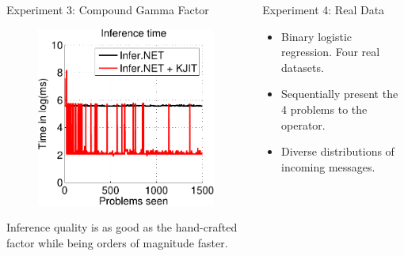 \documentclass[english]{beamer}
\begin{document}
\begin{frame}
\begin{columns}[t]
\begin{block}{ Experiment 3: Compound Gamma Factor }
\begin{figure}[ht]
{  \includegraphics[width=9cm]{online/cg_inference_time-crop}
  }
  \label{fig:cg_performance}
\end{figure}

\vspace{5mm}
Inference quality is as good as the hand-crafted factor while being orders of 
magnitude faster.
\end{block}

\begin{block}{ Experiment 4: Real Data}
\begin{itemize}
    \item Binary logistic regression.  Four real datasets.     
    \item Sequentially present the 4 problems to the operator.
    \item Diverse distributions of incoming messages.
\end{itemize}

\begin{figure}[ht]
  \centering


\end{figure}
\end{block}
\end{columns}
\end{frame}
\end{document}
